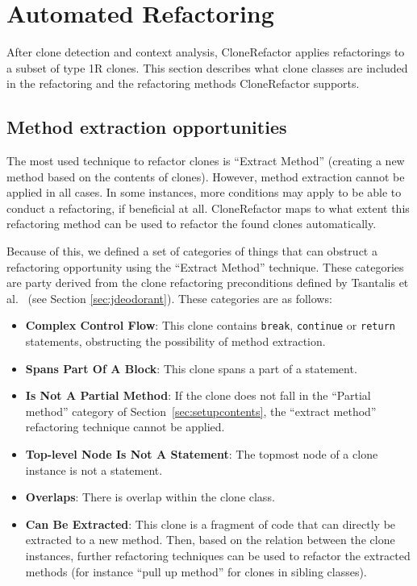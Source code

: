 \section{Automated Refactoring}
After clone detection and context analysis, CloneRefactor applies refactorings to a subset of type 1R clones. This section describes what clone classes are included in the refactoring and the refactoring methods CloneRefactor supports.

\subsection{Method extraction opportunities}\label{sec:refactorabilitysetup}
The most used technique to refactor clones is ``Extract Method'' (creating a new method based on the contents of clones). However, method extraction cannot be applied in all cases. In some instances, more conditions may apply to be able to conduct a refactoring, if beneficial at all. CloneRefactor maps to what extent this refactoring method can be used to refactor the found clones automatically.

Because of this, we defined a set of categories of things that can obstruct a refactoring opportunity using the ``Extract Method'' technique. These categories are party derived from the clone refactoring preconditions defined by Tsantalis et al.~\cite{tsantalis2015assessing} (see Section \ref{sec:jdeodorant}). These categories are as follows:
\begin{itemize}
    \item \textbf{Complex Control Flow}: This clone contains \texttt{break}, \texttt{continue} or \texttt{return} statements, obstructing the possibility of method extraction.
    \item \textbf{Spans Part Of A Block}: This clone spans a part of a statement.
    \item \textbf{Is Not A Partial Method}: If the clone does not fall in the ``Partial method'' category of Section~\ref{sec:setupcontents}, the ``extract method'' refactoring technique cannot be applied.
    \item \textbf{Top-level Node Is Not A Statement}: The topmost node of a clone instance is not a statement.
    \item \textbf{Overlaps}: There is overlap within the clone class.
    \item \textbf{Can Be Extracted}: This clone is a fragment of code that can directly be extracted to a new method. Then, based on the relation between the clone instances, further refactoring techniques can be used to refactor the extracted methods (for instance ``pull up method'' for clones in sibling classes).
\end{itemize}

